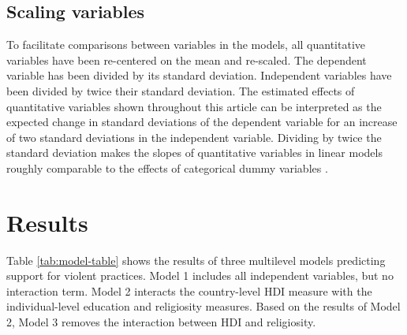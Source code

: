 \documentclass[10pt,letterpaper]{article}
\begin{document}
\subsection*{Scaling variables}

To facilitate comparisons between variables in the models, all quantitative variables have been re-centered on the mean and re-scaled. The dependent variable has been divided by its standard deviation. Independent variables have been divided by twice their standard deviation. The estimated effects of quantitative variables shown throughout this article can be interpreted as the expected change in standard deviations of the dependent variable for an increase of two standard deviations in the independent variable. Dividing by twice the standard deviation makes the slopes of quantitative variables in linear models roughly comparable to the effects of categorical dummy variables \cite{gelman_scaling_2008}.

\section*{Results}

Table \ref{tab:model-table} shows the results of three multilevel models predicting support for violent practices. Model 1 includes all independent variables, but no interaction term. Model 2 interacts the country-level HDI measure with the individual-level education and religiosity measures. Based on the results of Model 2, Model 3 removes the interaction between HDI and religiosity.
\end{document}
